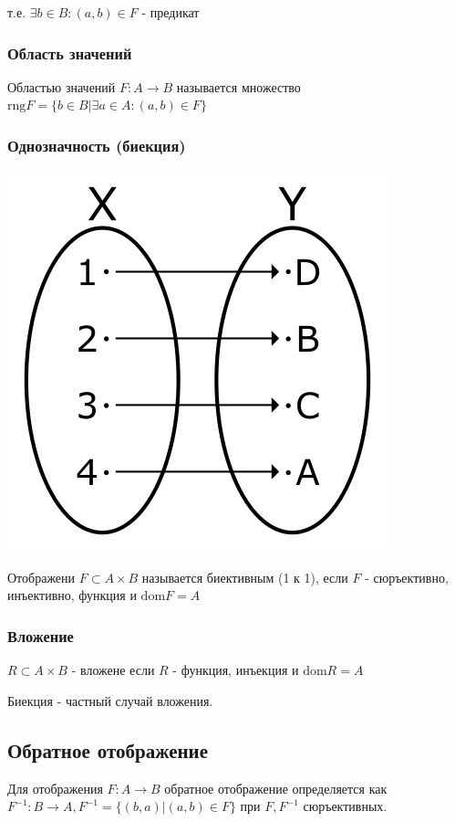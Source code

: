 \documentclass[letterpaper]{article}
\begin{document}
т.е. \(\exists b \in B: (a, b) \in F\) - предикат
\subsubsection{Область значений}
\label{sec:org7e60f97}
Областью значений \(F: A \rightarrow B\)
называется множество \(\text{rng} F = \{b \in B | \exists a \in A: (a, b) \in F\}\)
\subsubsection{Однозначность (биекция)}
\label{sec:org74f5851}
\begin{center}
\includegraphics[width=.9\linewidth]{./src/Bijection.png}
\end{center}
Отображени \(F \subset A \times B\) называется биективным (1 к 1), если
\(F\) - сюръективно, инъективно, функция и \(\text{dom} F = A\)
\subsubsection{Вложение}
\label{sec:org2e138fb}
\(R \subset A \times B\) - вложене если \(R\) - функция, инъекция и \(\text{dom} R = A\)

Биекция - частный случай вложения.
\subsection{Обратное отображение}
\label{sec:orgc2e41ee}
Для отображения \(F: A \rightarrow B\) обратное отображение определяется как
\(F^{-1}: B \rightarrow A, F^{-1} = \{(b, a) | (a, b) \in F\}\) при \(F, F^{-1}\) сюръективных.
\end{document}
